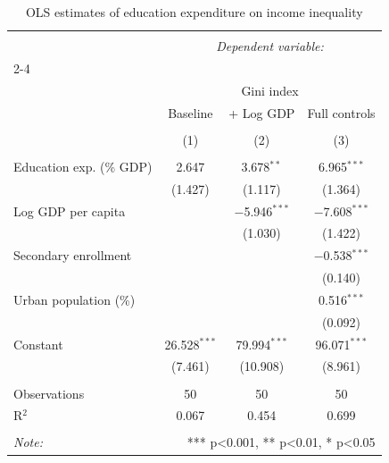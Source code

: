
\begin{table}[!htbp] \centering 
  \caption{OLS estimates of education expenditure on income inequality} 
  \label{tab:ols} 
\begin{tabular}{@{\extracolsep{5pt}}lccc} 
\\[-1.8ex]\hline 
\hline \\[-1.8ex] 
 & \multicolumn{3}{c}{\textit{Dependent variable:}} \\ 
\cline{2-4} 
\\[-1.8ex] & \multicolumn{3}{c}{Gini index} \\ 
 & Baseline & + Log GDP & Full controls \\ 
\\[-1.8ex] & (1) & (2) & (3)\\ 
\hline \\[-1.8ex] 
 Education exp. (\% GDP) & 2.647 & 3.678$^{**}$ & 6.965$^{***}$ \\ 
  & (1.427) & (1.117) & (1.364) \\ 
  Log GDP per capita &  & $-$5.946$^{***}$ & $-$7.608$^{***}$ \\ 
  &  & (1.030) & (1.422) \\ 
  Secondary enrollment &  &  & $-$0.538$^{***}$ \\ 
  &  &  & (0.140) \\ 
  Urban population (\%) &  &  & 0.516$^{***}$ \\ 
  &  &  & (0.092) \\ 
  Constant & 26.528$^{***}$ & 79.994$^{***}$ & 96.071$^{***}$ \\ 
  & (7.461) & (10.908) & (8.961) \\ 
 \hline \\[-1.8ex] 
Observations & 50 & 50 & 50 \\ 
R$^{2}$ & 0.067 & 0.454 & 0.699 \\ 
\hline 
\hline \\[-1.8ex] 
\textit{Note:}  & \multicolumn{3}{r}{*** p<0.001, ** p<0.01, * p<0.05} \\ 
\end{tabular} 
\end{table} 
